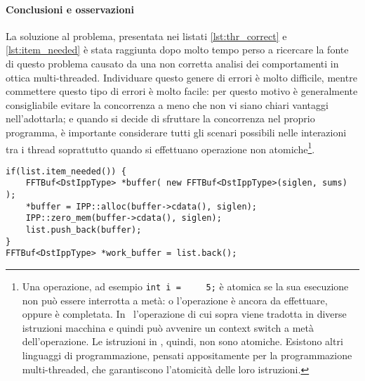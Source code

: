 \paragraph{Conclusioni e osservazioni}
La soluzione al problema, presentata nei listati \ref{lst:thr_correct} e
\ref{lst:item_needed} \`e stata raggiunta dopo molto tempo perso a ricercare la
fonte di questo problema causato da una non corretta analisi dei comportamenti
in ottica multi-threaded.  Individuare questo genere di errori \`e molto
difficile, mentre commettere questo tipo di errori \`e molto facile: per questo
motivo \`e generalmente consigliabile evitare la concorrenza a meno che non vi
siano chiari vantaggi nell'adottarla; e quando si decide di sfruttare la
concorrenza nel proprio programma, \`e importante considerare tutti gli scenari
possibili nelle interazioni tra i thread soprattutto quando si effettuano
operazione non atomiche\footnote{Una operazione, ad esempio \lstinline$int i =
    5;$ \`e atomica se la sua esecuzione non pu\`o essere interrotta a met\`a: o
        l'operazione \`e ancora da effettuare, oppure \`e completata. In \CC\, 
        l'operazione di cui sopra viene tradotta in diverse istruzioni macchina
        e quindi pu\`o avvenire un context switch a met\`a dell'operazione. Le
        istruzioni in \CC, quindi, non sono atomiche. Esistono altri linguaggi
        di programmazione, pensati appositamente per la programmazione
        multi-threaded, che garantiscono l'atomicit\`a delle loro istruzioni.}.
\begin{lstlisting}[float,label=lst:thr_correct,caption=Codice funzionante anche
in ambiente multi-threaded]
if(list.item_needed()) {
	FFTBuf<DstIppType> *buffer( new FFTBuf<DstIppType>(siglen, sums) );
	*buffer = IPP::alloc(buffer->cdata(), siglen);
	IPP::zero_mem(buffer->cdata(), siglen);
	list.push_back(buffer);
}
FFTBuf<DstIppType> *work_buffer = list.back();
\end{lstlisting}


